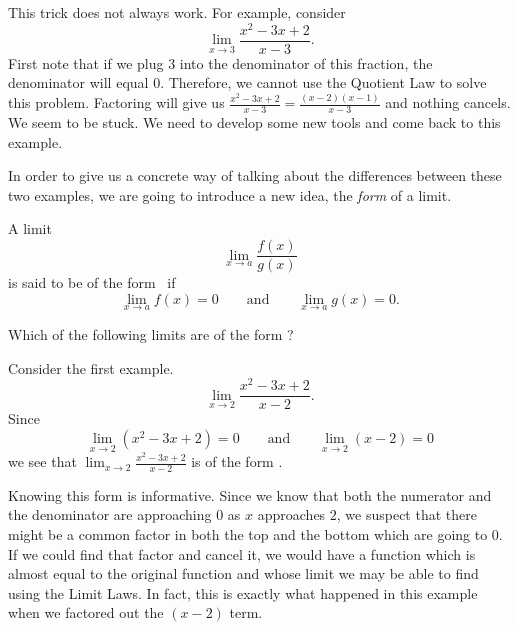 \documentclass{ximera}
\begin{document}
This trick does not always work.  For example, consider
\[
\lim_{x\to 3}\frac{x^2-3x+2}{x-3}.
\]
First note that if we plug $3$ into the denominator of this fraction,
the denominator will equal $0$.  Therefore, we cannot use the Quotient
Law to solve this problem.  Factoring will give us
$\frac{x^2-3x+2}{x-3}=\frac{(x-2)(x-1)}{x-3}$ and nothing cancels.  We
seem to be stuck.  We need to develop some new tools and come back to
this example.

In order to give us a concrete way of talking about the differences
between these two examples, we are going to introduce a new idea, the
\textit{form} of a limit.

\begin{definition}
  A limit
  \[
  \lim_{x\to a} \frac{f(x)}{g(x)}
  \]
  is said to be of the form \zeroOverZero\ if
  \[
  \lim_{x\to a} f(x) = 0\qquad\text{and}\qquad \lim_{x\to a} g(x) =0.
  \]
\end{definition}

\begin{question}
  Which of the following limits are of the form \zeroOverZero?
  \begin{multipleChoice}
  \end{multipleChoice}
\end{question}



Consider the first example.
\[
\lim_{x\to 2}\frac{x^2-3x+2}{x-2}.
\]
Since
\[
\lim_{x\to 2}\left(x^2-3x+2\right) = 0\qquad\text{and}\qquad \lim_{x\to
  2}\left(x-2\right) = 0
\]
we see that $\lim_{x\to 2}\frac{x^2-3x+2}{x-2}$ is of the form
\zeroOverZero.

Knowing this form is informative.  Since we know that both the
numerator and the denominator are approaching $0$ as $x$ approaches
$2$, we suspect that there might be a common factor in both the top
and the bottom which are going to $0$.  If we could find that factor
and cancel it, we would have a function which is almost equal to the
original function and whose limit we may be able to find using the
Limit Laws.  In fact, this is exactly what happened in this example
when we factored out the $(x-2)$ term.
\end{document}

